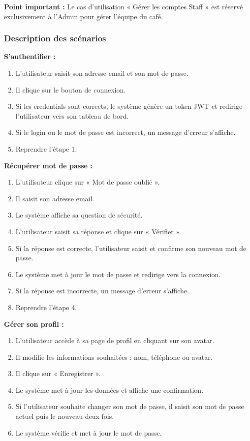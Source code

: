 \textbf{Point important :} Le cas d'utilisation « Gérer les comptes Staff » est réservé exclusivement à l'Admin pour gérer l'équipe du café.

\subsubsection{Description des scénarios}

\textbf{S'authentifier :}
\begin{enumerate}
\item L'utilisateur saisit son adresse email et son mot de passe.
\item Il clique sur le bouton de connexion.
\item Si les credentials sont corrects, le système génère un token JWT et redirige l'utilisateur vers son tableau de bord.
\item Si le login ou le mot de passe est incorrect, un message d'erreur s'affiche.
\item Reprendre l'étape 1.
\end{enumerate}

\textbf{Récupérer mot de passe :}
\begin{enumerate}
\item L'utilisateur clique sur « Mot de passe oublié ».
\item Il saisit son adresse email.
\item Le système affiche sa question de sécurité.
\item L'utilisateur saisit sa réponse et clique sur « Vérifier ».
\item Si la réponse est correcte, l'utilisateur saisit et confirme son nouveau mot de passe.
\item Le système met à jour le mot de passe et redirige vers la connexion.
\item Si la réponse est incorrecte, un message d'erreur s'affiche.
\item Reprendre l'étape 4.
\end{enumerate}

\textbf{Gérer son profil :}
\begin{enumerate}
\item L'utilisateur accède à sa page de profil en cliquant sur son avatar.
\item Il modifie les informations souhaitées : nom, téléphone ou avatar.
\item Il clique sur « Enregistrer ».
\item Le système met à jour les données et affiche une confirmation.
\item Si l'utilisateur souhaite changer son mot de passe, il saisit son mot de passe actuel puis le nouveau deux fois.
\item Le système vérifie et met à jour le mot de passe.
\end{enumerate}

